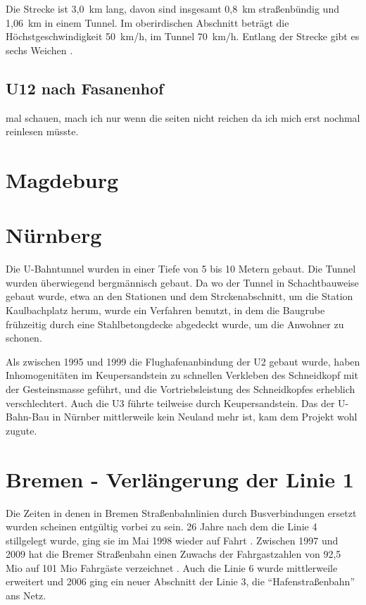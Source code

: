 Die Strecke ist 3,0{\ }km lang, davon sind insgesamt 0,8{\ }km straßenbündig und 1,06{\ }km in einem Tunnel.
Im oberirdischen Abschnitt beträgt die Höchst\-gesch\-windig\-keit 50{\ }km/h, im Tunnel 70{\ }km/h.
Entlang der Strecke gibt es sechs Weichen \cite{u15mail}.

\subsection*{U12 nach Fasanenhof}

mal schauen, mach ich nur wenn die seiten nicht reichen da ich mich erst nochmal reinlesen müsste.


\section{Magdeburg}


\section{Nürnberg}

Die U-Bahntunnel wurden in einer Tiefe von 5 bis 10 Metern gebaut\cite{nbRef3}. Die Tunnel wurden überwiegend bergmännisch gebaut. Da wo der Tunnel in Schachtbauweise gebaut wurde, etwa an den Stationen und dem Strckenabschnitt, um die Station Kaulbachplatz herum, wurde ein Verfahren benutzt, in dem die Baugrube frühzeitig durch eine Stahlbetongdecke abgedeckt wurde, um die Anwohner zu schonen\cite{nbBr}. 

Als zwischen 1995 und 1999 die Flughafenanbindung der U2 gebaut wurde, haben Inhomogenitäten im Keupersandstein zu schnellen Verkleben des Schneidkopf mit der Gesteinsmasse geführt, und die Vortriebsleistung des Schneidkopfes erheblich verschlechtert\cite{nbGeo}. Auch die U3 führte teilweise durch Keupersandstein\cite{nbRef3}. Das der U-Bahn-Bau in Nürnber mittlerweile kein Neuland mehr ist, kam dem Projekt wohl zugute.

\section[Bremen]{Bremen - Verlängerung der Linie 1}

Die Zeiten in denen in Bremen Straßenbahnlinien durch Busverbindungen ersetzt wurden scheinen entgültig vorbei zu sein. 26 Jahre nach dem die Linie 4 stillgelegt wurde, ging sie im Mai 1998 wieder auf Fahrt \cite{bSv11}. Zwischen 1997 und 2009 hat die Bremer Straßenbahn einen Zuwachs der Fahrgastzahlen von 92,5 Mio auf 101 Mio Fahrgäste verzeichnet \cite{bNp10}. Auch die Linie 6 wurde mittlerweile erweitert und 2006 ging ein neuer Abschnitt der Linie 3, die ``Hafenstraßenbahn'' ans Netz. 

